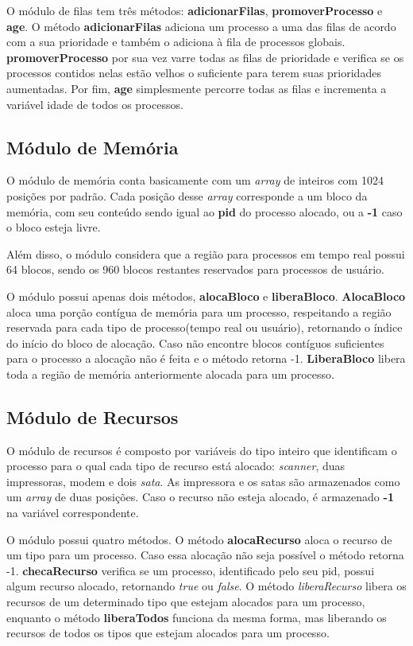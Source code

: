\documentclass[a4paper]{article}
\begin{document}
O módulo de filas tem três métodos: \textbf{adicionarFilas}, \textbf{promoverProcesso} e \textbf{age}. O método \textbf{adicionarFilas} adiciona um processo a uma das filas de acordo com a sua prioridade e também o adiciona à fila de processos globais. \textbf{promoverProcesso} por sua vez varre todas as filas de prioridade e verifica se os processos contidos nelas estão velhos o suficiente para terem suas prioridades aumentadas. Por fim, \textbf{age} simplesmente percorre todas as filas e incrementa a variável idade de todos os processos.


\subsection{Módulo de Memória}
	O módulo de memória conta basicamente com um \emph{array} de inteiros com 1024 posições por padrão. Cada posição desse \emph{array} corresponde a um bloco da memória, com seu conteúdo sendo igual ao \textbf{pid} do processo alocado, ou a \textbf{-1} caso o bloco esteja livre.
	
	Além disso, o módulo considera que a região para processos em tempo real possui 64 blocos, sendo os 960 blocos restantes reservados para processos de usuário.
	
	O módulo possui apenas dois métodos, \textbf{alocaBloco} e \textbf{liberaBloco}. \textbf{AlocaBloco} aloca uma porção contígua de memória para um processo, respeitando a região reservada para cada tipo de processo(tempo real ou usuário), retornando o índice do início do bloco de alocação. Caso não encontre blocos contíguos suficientes para o processo a alocação não é feita e o método retorna -1. \textbf{LiberaBloco} libera toda a região de memória anteriormente alocada para um processo.

\subsection{Módulo de Recursos}
	O módulo de recursos é composto por variáveis do tipo inteiro que identificam o processo para o qual cada tipo de recurso está alocado: \emph{scanner}, duas impressoras, modem e dois \emph{sata}. As impressora e os satas são armazenados como um \emph{array} de duas posições. Caso o recurso não esteja alocado, é armazenado \textbf{-1} na variável correspondente.

	O módulo possui quatro métodos. O método \textbf{alocaRecurso} aloca o recurso de um tipo para um processo. Caso essa alocação não seja possível o método retorna -1. \textbf{checaRecurso} verifica se um processo, identificado pelo seu pid, possui algum recurso alocado, retornando \emph{true} ou \emph{false}. O método \emph{liberaRecurso} libera os recursos de um determinado tipo que estejam alocados para um processo, enquanto o método \textbf{liberaTodos} funciona da mesma forma, mas liberando os recursos de todos os tipos que estejam alocados para um processo.
	
\end{document}
